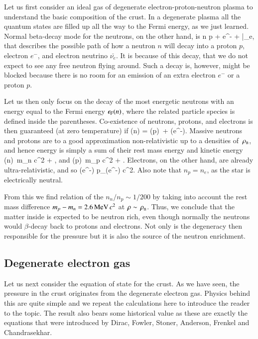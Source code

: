 Let us first consider an ideal gas of degenerate electron-proton-neutron plasma to understand the basic composition of the crust.\cite[see e.g.][]{Phillips94}
In a degenerate plasma all the quantum states are filled up all the way to the Fermi energy, as we just learned.
Normal beta-decay mode for the neutrons, on the other hand, is 
\be
n \rightarrow p + e^{-} + \bar{\nu_{e}},
\ee
that describes the possible path of how a neutron $n$ will decay into a proton $p$, electron $e^{-}$, and electron neutrino $\bar{\nu_{e}}$.
It is because of this decay, that we do not expect to see any free neutron flying around.
Such a decay is, however, might be blocked because there is no room for an emission of an extra electron $e^{-}$ or a proton $p$.

Let us then only focus on the decay of the most energetic neutrons with an energy equal to the Fermi energy $\epsilon_{\mathrm{F}} (n)$, where the related particle species is defined inside the parentheses.
Co-existence of neutrons, protons, and electrons is then guaranteed (at zero temperature) if 
\be
\ef(n) = \ef(p) + \ef(e^{-}).
\ee
Massive neutrons and protons are to a good approximation non-relativistic up to a densities of $\, \rho_{\mathrm{n}} $, and hence energy is simply a sum of their rest mass energy and kinetic energy
\be
\ef(n) \approx m_n c^2 + ,
\ee
and
\be
\ef(p) \approx m_p c^2 + .
\ee
Electrons, on the other hand, are already ultra-relativistic, and so
\be
\ef(e^{-}) \approx p_{}(e^{-}) c^2.
\ee
Also note that $n_p = n_e$, as the star is electrically neutral.

From this we find relation of the $n_n/n_p \sim 1/200$ by taking into account the rest mass difference $m_p - m_n = 2.6 \, \mathrm{MeV}\, c^2$ at $\rho \sim \, \rho_{\mathrm{n}} $.
Thus, we conclude that the matter inside is expected to be neutron rich, even though normally the neutrons would $\beta$-decay back to protons and electrons.
Not only is the degeneracy then responsible for the pressure but it is also the source of the neutron enrichment. 


\subsection{Degenerate electron gas}
Let us next consider the equation of state for the crust.
As we have seen, the pressure in the crust originates from the degenerate electron gas.
Physics behind this are quite simple and we repeat the calculations here to introduce the reader to the topic.
The result also bears some historical value as these are exactly the equations that were introduced by Dirac\cite{Dirac25}, Fowler\cite{Fowler26}, Stoner\cite{Stoner30}, Anderson\cite{Anderson29}, Frenkel\cite{Frenkel28} and Chandrasekhar\cite{Cha31}.%
\cite[For a review, see e.g.,][]{LL80, HPY07}

